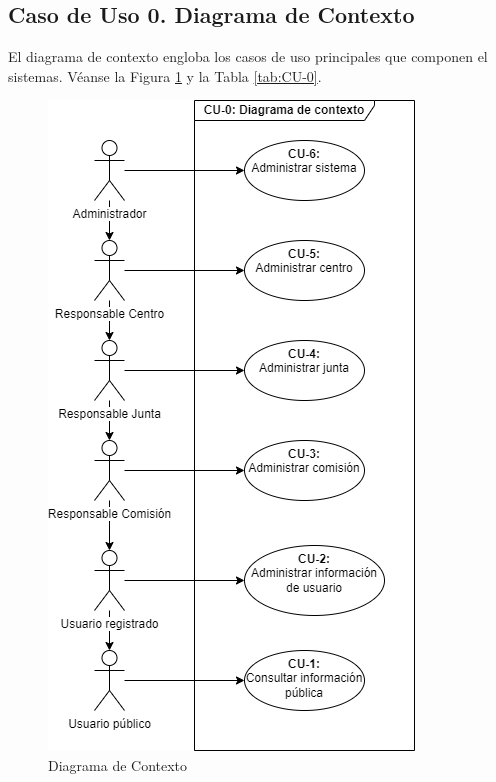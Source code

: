 \subsection{Caso de Uso 0. Diagrama de Contexto}\label{sec:CU-0}         

  El diagrama de contexto engloba los casos de uso principales que componen el sistemas. Véanse la Figura \ref{fig:Diagrama-Contexto} y la Tabla \ref{tab:CU-0}.

\begin{figure}[H]
        \centering
        \includegraphics[scale=0.6]{img/diagramas/Funcional/CU-0.png}
        \caption{Diagrama de Contexto}\label{fig:Diagrama-Contexto}
\end{figure}

